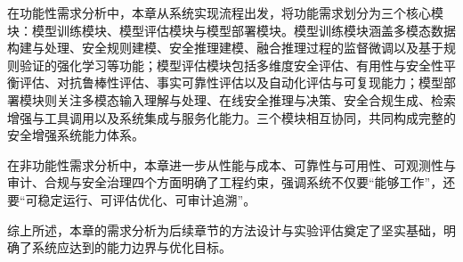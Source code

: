 在功能性需求分析中，本章从系统实现流程出发，将功能需求划分为三个核心模块：模型训练模块、模型评估模块与模型部署模块。模型训练模块涵盖多模态数据构建与处理、安全规则建模、安全推理建模、融合推理过程的监督微调以及基于规则验证的强化学习等功能；模型评估模块包括多维度安全评估、有用性与安全性平衡评估、对抗鲁棒性评估、事实可靠性评估以及自动化评估与可复现能力；模型部署模块则关注多模态输入理解与处理、在线安全推理与决策、安全合规生成、检索增强与工具调用以及系统集成与服务化能力。三个模块相互协同，共同构成完整的安全增强系统能力体系。

在非功能性需求分析中，本章进一步从性能与成本、可靠性与可用性、可观测性与审计、合规与安全治理四个方面明确了工程约束，强调系统不仅要“能够工作”，还要“可稳定运行、可评估优化、可审计追溯”。

综上所述，本章的需求分析为后续章节的方法设计与实验评估奠定了坚实基础，明确了系统应达到的能力边界与优化目标。
